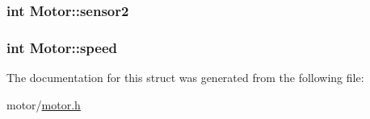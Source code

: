 \subsubsection[{\texorpdfstring{sensor2}{sensor2}}]{\setlength{\rightskip}{0pt plus 5cm}int Motor\+::sensor2}\hypertarget{structMotor_af73c223c8ca63799035f3f544fa52dae}{}\label{structMotor_af73c223c8ca63799035f3f544fa52dae}
\subsubsection[{\texorpdfstring{speed}{speed}}]{\setlength{\rightskip}{0pt plus 5cm}int Motor\+::speed}\hypertarget{structMotor_a68b835dd35395fbab7b32eb0bbc12283}{}\label{structMotor_a68b835dd35395fbab7b32eb0bbc12283}


The documentation for this struct was generated from the following file\+:\begin{DoxyCompactItemize}
\item 
motor/\hyperlink{motor_8h}{motor.\+h}\end{DoxyCompactItemize}
